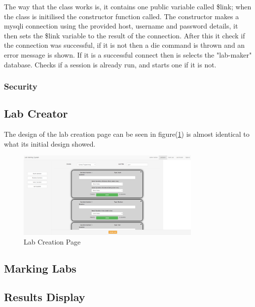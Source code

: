 \documentclass[12pt]{article}  %
\begin{document}
\noindent The way that the class works is, it contains one public variable called \$link; when the class is initilised the constructor function called. The constructor makes a mysqli connection using the provided host, username and password details, it then sets the \$link variable to the result of the connection. After this it check if the connection was successful, if it is not then a die command is thrown and an error message is shown. If it is a successful connect then is selects the "lab-maker" database. Checks if a session is already run, and starts one if it is not.

\subsubsection{Security}
\label{sec:security}





\subsection{Lab Creator}
The design of the lab creation page can be seen in figure(\ref{fig:lab-creator}) is almost identical to what its initial design showed. 

\begin{figure}[H]
    \centering
    \includegraphics[width=0.8\textwidth]{images/implementation/lab-creator-1-page.png}
    \caption{Lab Creation Page}
    \label{fig:lab-creator}
\end{figure}

\subsection{Marking Labs}

\subsection{Results Display}
\end{document}
